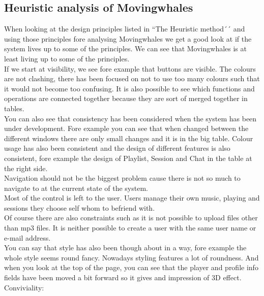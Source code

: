 \subsection{Heuristic analysis of Movingwhales}

When looking at the design principles listed in ``The Heuristic method´´ and using those principles fore analysing Movingwhales we get a good look at if the system lives up to some of the principles. We can see that Movingwhales is at least living up to some of the principles.\\

If we start at visibility, we see fore example that buttons are visible. The colours are not clashing, there has been focused on not to use too many colours such that it would not become too confusing. It is also possible to see which functions and operations are connected together because they are sort of merged together in tables.\\

You can also see that consistency has been considered when the system has been under development. Fore example you can see that when changed between the different windows there are only small changes and it is in the big table. Colour usage has also been consistent and the design of different features  is also consistent, fore example the design of Playlist, Session and Chat in the table at the right side.\\

Navigation should not be the biggest problem cause there is not so much to navigate to at the current state of the system.\\

Most of the control is left to the user. Users manage their own music, playing and sessions they choose self whom to befriend with.\\

Of course there are also constraints such as it is not possible to upload files other than mp3 files. It is neither possible to create a user with the same user name or e-mail address.\\

You can say that style has also been though about in a way, fore example the whole style seems round fancy. Nowadays styling features a lot of roundness. And when you look at the top of the page, you can see that the player and profile info fields have been moved a bit forward so it gives and impression of 3D effect.\\

Conviviality: %
